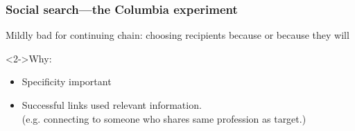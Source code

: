 
\begin{frame}
  \frametitle{Social search---the Columbia experiment}

  \begin{block}{Mildly bad for continuing chain:}
    choosing recipients because 
    or because they will 
  \end{block}

  \begin{block}<2->{Why:}
    \begin{itemize}
    \item<2-> 
      Specificity important
    \item<3-> 
      Successful links used relevant information.\\
      (e.g. connecting to someone who shares same profession as target.)
    \end{itemize}
  \end{block}

\end{frame}


